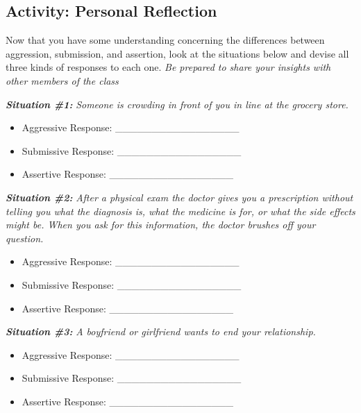 \documentclass[
]{book}
\providecommand{\tightlist}{%
  \setlength{\itemsep}{0pt}\setlength{\parskip}{0pt}}
\begin{document}
\hypertarget{activity-personal-reflection}{%
\subsection*{Activity: Personal Reflection}\label{activity-personal-reflection}}

\begin{reflect}
Now that you have some understanding concerning the differences between aggression, submission, and assertion, look at the situations below and devise all three kinds of responses to each one. \emph{Be prepared to share your insights with other members of the class}

\textbf{\emph{Situation \#1:}} \emph{Someone is crowding in front of you in line at the grocery store.}

\begin{itemize}
\tightlist
\item
  Aggressive Response: \_\_\_\_\_\_\_\_\_\_\_\_\_\_\_\_\_\\
\item
  Submissive Response: \_\_\_\_\_\_\_\_\_\_\_\_\_\_\_\_\_\\
\item
  Assertive Response: \_\_\_\_\_\_\_\_\_\_\_\_\_\_\_\_\_
\end{itemize}

\textbf{\emph{Situation \#2:}} \emph{After a physical exam the doctor gives you a prescription without telling you what the diagnosis is, what the medicine is for, or what the side effects might be. When you ask for this information, the doctor brushes off your question.}

\begin{itemize}
\tightlist
\item
  Aggressive Response: \_\_\_\_\_\_\_\_\_\_\_\_\_\_\_\_\_\\
\item
  Submissive Response: \_\_\_\_\_\_\_\_\_\_\_\_\_\_\_\_\_\\
\item
  Assertive Response: \_\_\_\_\_\_\_\_\_\_\_\_\_\_\_\_\_
\end{itemize}

\textbf{\emph{Situation \#3:}} \emph{A boyfriend or girlfriend wants to end your relationship.}

\begin{itemize}
\tightlist
\item
  Aggressive Response: \_\_\_\_\_\_\_\_\_\_\_\_\_\_\_\_\_\\
\item
  Submissive Response: \_\_\_\_\_\_\_\_\_\_\_\_\_\_\_\_\_\\
\item
  Assertive Response: \_\_\_\_\_\_\_\_\_\_\_\_\_\_\_\_\_
\end{itemize}


\end{reflect}
\end{document}
